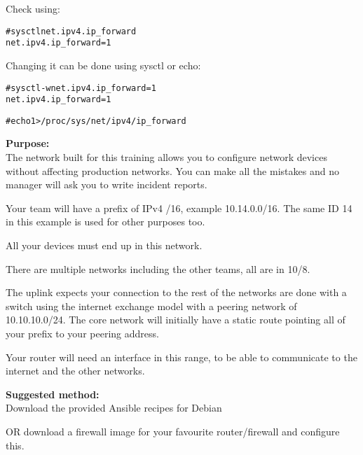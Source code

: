 \documentclass[a4paper,11pt,notitlepage]{report}
\begin{document}
Check using:
\begin{alltt}
# sysctl net.ipv4.ip_forward
net.ipv4.ip_forward = 1
\end{alltt}

Changing it can be done using sysctl or echo:
\begin{alltt}
# sysctl -w net.ipv4.ip_forward=1
net.ipv4.ip_forward = 1

# echo 1 > /proc/sys/net/ipv4/ip_forward
\end{alltt}


{\bf Purpose:}\\
The network built for this training allows you to configure network devices without affecting production networks. You can make all the mistakes and no manager will ask you to write incident reports.

Your team will have a prefix of IPv4 /16, example 10.14.0.0/16. The same ID 14 in this example is used for other purposes too.

All your devices must end up in this network.

There are  multiple networks including the other teams, all are in 10/8.

The uplink expects your connection to the rest of the networks are done with a switch using the internet exchange model with a peering network of 10.10.10.0/24. The core network will initially have a static route pointing all of your prefix to your peering address.

Your router will need an interface in this range, to be able to communicate to the internet and the other networks.

{\bf Suggested method:}\\
Download the provided Ansible recipes for Debian

OR download a firewall image for your favourite router/firewall and configure this.
\end{document}
